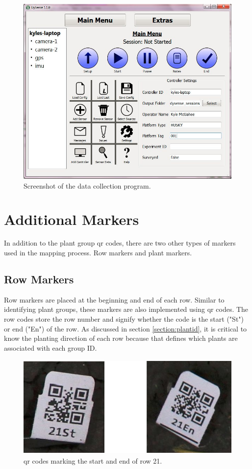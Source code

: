 \begin{figure}
	\centering
    \includegraphics[width=6in]{figures/dysense2.jpg}
    \caption[Data collection program]{Screenshot of the data collection program.}
    \label{dysense_screenshot}
\end{figure}

\section{Additional Markers}
\label{system-markers}

In addition to the plant group \ac{qr} codes, there are two other types of markers used in the mapping process. Row markers and plant markers.   

\subsection{Row Markers}

Row markers are placed at the beginning and end of each row. Similar to identifying plant groups, these markers are also implemented using \ac{qr} codes.  The row codes store the row number and signify whether the code is the start ("St") or end ("En") of the row. As discussed in section \ref{section:plantid}, it is critical to know the planting direction of each row because that defines which plants are associated with each group ID.

\begin{figure}
	\centering
    \includegraphics[height=2in]{figures/row_codes.jpg}
    \caption[Row QR codes]{\ac{qr} codes marking the start and end of row 21.}
    \label{figure:row_codes}
\end{figure}

